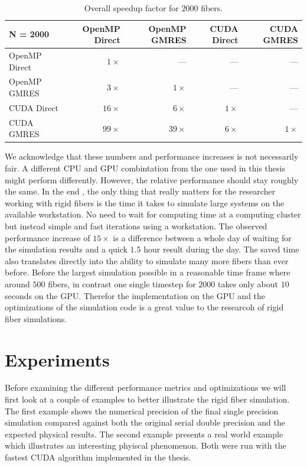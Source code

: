 \documentclass[a4paper,11pt]{kth-mag}
\begin{document}
\begin{table}[!htbp]
  \begin{center}
    \begin{tabulary}{\textwidth}{lRRRR}
      \toprule
      N = 2000 & OpenMP Direct & OpenMP GMRES & CUDA Direct & CUDA GMRES \\
      \midrule
      OpenMP Direct & $1×$  & $—$   & $—$ & $—$ \\
      OpenMP GMRES  & $3×$  & $1×$  & $—$ & $—$ \\
      CUDA Direct   & $16×$ & $6×$  & $1×$ & $—$ \\
      CUDA GMRES    & $99×$ & $39×$ & $6×$ & $1×$ \\
      \bottomrule
    \end{tabulary}
  \end{center}
  \caption{Overall speedup factor for $2000$ fibers.}
  \label{tab:overall_speedup}
\end{table}

We acknowledge that these numbers and performance increases is not necessarily fair. A different CPU and GPU combintation from the one used in this thesis might perform differently. However, the relative performance should stay roughly the same. In the end , the only thing that really matters for the researcher working with rigid fibers is the time it takes to simulate large systems on the available workstation. No need to wait for computing time at a computing cluster but instead simple and fast iterations using a workstation. The observed performance increase of $15×$ is a difference between a whole day of waiting for the simulation results and a quick $1.5$ hour result during the day. The saved time also translates directly into the ability to simulate many more fibers than ever before. Before the largest simulation possible in a reasonable time frame where around $500$ fibers, in contrast one single timestep for $2000$ takes only about $10$ seconds on the GPU. Therefor the implementation on the GPU and the optimizations of the simulation code is a great value to the researcoh of rigid fiber simulations.

\chapter{Experiments}

Before examining the different performance metrics and optimizations we will first look at a couple of examples to better illustrate the rigid fiber simulation. The first example shows the numerical precision of the final single precision simulation compared against both the original serial double precision and the expected physical results. The second example presents a real world example which illustrates an interesting phyiscal phenomenon. Both were run with the fastest CUDA algorithm implemented in the thesis.
\end{document}
